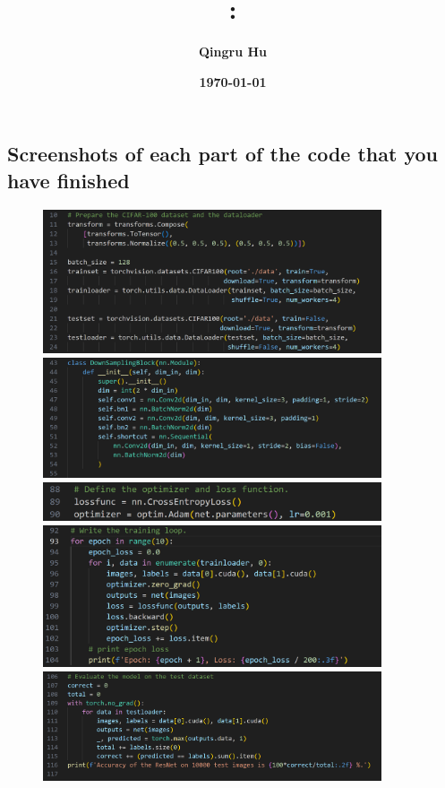 \documentclass{article}
\title{\textmd{\bf \Class: \Title}}
\date{\textbf{\today}}
\author{\textbf{Qingru Hu \quad 2020012996}}
\begin{document}
\begin{spacing}{1.1}
\maketitle \thispagestyle{empty}

\section{Screenshots of each part of the code that you have finished}
\begin{figure}[htbp]
  \centering
  \includegraphics*[width=10cm]{s1.png}
  \includegraphics*[width=10cm]{s2.png}
  \includegraphics*[width=10cm]{s3.png}
  \includegraphics*[width=10cm]{s4.png}
  \includegraphics*[width=10cm]{s5.png}
\end{figure}


\end{spacing}
\end{document}
